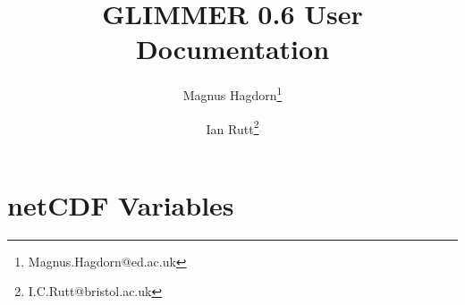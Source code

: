 \newcommand{\dir}{ug}

\pagestyle{myheadings}


\title{GLIMMER 0.6 User Documentation}
\author{Magnus Hagdorn\thanks{Magnus.Hagdorn@ed.ac.uk} \and Ian Rutt\thanks{I.C.Rutt@bristol.ac.uk}}
\maketitle
\tableofcontents
\newpage


\appendix
\section{netCDF Variables}

